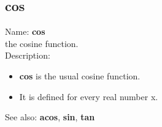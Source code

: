 \subsection{ cos }
\noindent Name: \textbf{cos}\\
the cosine function.\\

\noindent Description: \begin{itemize}

\item \textbf{cos} is the usual cosine function.

\item It is defined for every real number x.
\end{itemize}
See also: \textbf{acos}, \textbf{sin}, \textbf{tan}
